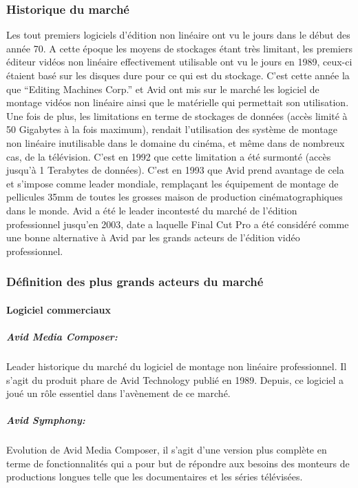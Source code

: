 \subsubsection {Historique du marché}
Les tout premiers logiciels d'édition non linéaire ont vu le jours dans le début des année 70.
A cette époque les moyens de stockages étant très limitant, les premiers éditeur vidéos non linéaire
effectivement utilisable ont vu le jours en 1989, ceux-ci étaient basé sur les disques dure pour ce
qui est du stockage. C'est cette année la que ``Editing Machines Corp.'' et Avid ont mis sur le
marché les logiciel de montage vidéos non linéaire ainsi que le matérielle qui permettait son
utilisation. Une fois de plus, les limitations en terme de stockages de données (accès limité à 50 Gigabytes
à la fois maximum), rendait l'utilisation des système de montage non linéaire inutilisable dans le domaine
du cinéma, et même dans de nombreux cas, de la télévision. C'est en 1992 que cette limitation a été surmonté
(accès jusqu'à 1 Terabytes de données). C'est en 1993 que Avid prend avantage de cela et s'impose
comme leader mondiale, remplaçant les équipement de montage de pellicules 35mm de toutes les grosses maison
de production cinématographiques dans le monde. Avid a été le leader incontesté du marché de l'édition
professionnel jusqu'en 2003, date a laquelle Final Cut Pro a été considéré comme une bonne alternative
à Avid par les grands acteurs de l'édition vidéo professionnel.

\subsubsection{Définition des plus grands acteurs du marché}

\paragraph {Logiciel commerciaux}

\subparagraph{Avid Media Composer:}
Leader historique du marché du logiciel de montage non linéaire
professionnel. Il s'agit du produit phare de Avid Technology publié en 1989. Depuis, ce
logiciel a joué un rôle essentiel dans l'avènement de ce marché.

\subparagraph{Avid Symphony:}
Evolution de Avid Media Composer, il s'agit d'une version plus complète en terme
de fonctionnalités qui a pour but de répondre aux besoins des monteurs de productions longues telle que
les documentaires et les séries télévisées.

